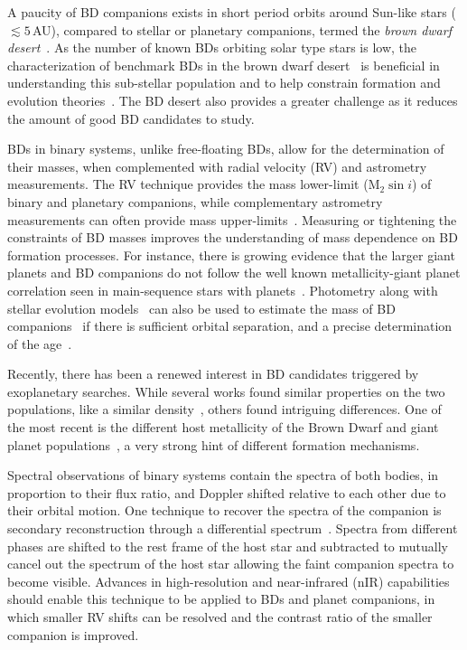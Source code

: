 \documentclass[fleqn,usenatbib]{mnras}
\begin{document}
A paucity of BD companions exists in short period orbits around Sun-like stars (\(\lesssim5\)\,AU), compared to stellar or planetary companions, termed the \emph{brown dwarf desert}~\citep{halbwachs_exploring_2000,zucker_analysis_2001,sahlmann_search_2011}. As the number of known BDs orbiting solar type stars is low, the characterization of benchmark BDs in the brown dwarf desert~\citep[e.g.][]{crepp_trends_2016} is beneficial in understanding this sub-stellar population and to help constrain formation and evolution theories~\citep{whitworth_formation_2007}. The BD desert also provides a greater challenge as it reduces the amount of good BD candidates to study.

BDs in binary systems, unlike free-floating BDs, allow for the determination of their masses, when complemented with radial velocity (RV) and astrometry measurements. The RV technique provides the mass lower-limit (\(\textrm{M}_{2}\sin{i}\)) of binary and planetary companions, while complementary astrometry measurements can often provide mass upper-limits~\citep[e.g.][]{sahlmann_search_2011}. Measuring or tightening the constraints of BD masses improves the understanding of mass dependence on BD formation processes. For instance, there is growing evidence that the larger giant planets and BD companions do not follow the well known metallicity-giant planet correlation seen in main-sequence stars with planets~\citep[e.g.][]{santos_spectroscopic_2004,santos_observational_2017, maldonado_searching_2017}. Photometry along with stellar evolution models~\citep[e.g.][]{baraffe_evolutionary_2003,allard_btsettl_2013} can also be used to estimate the mass of BD companions~\citep[e.g.][]{moutou_eccentricity_2017} if there is sufficient orbital separation, and a precise determination of the age~\citep[e.g.][]{soderblom_ages_2010}.

Recently, there has been a renewed interest in BD candidates triggered by exoplanetary searches. While several works found similar properties on the two populations, like a similar density~\citep{hatzes_definition_2015}, others found intriguing differences. One of the most recent is the different host metallicity of the Brown Dwarf and giant planet populations~\citep{santos_observational_2017, schlaufman_evidence_2018}, a very strong hint of different formation mechanisms.

Spectral observations of binary systems contain the spectra of both bodies, in proportion to their flux ratio, and Doppler shifted relative to each other due to their orbital motion. One technique to recover the spectra of the companion is secondary reconstruction through a differential spectrum~\citep{ferluga_separating_1997}. Spectra from different phases are shifted to the rest frame of the host star and subtracted to mutually cancel out the spectrum of the host star allowing the faint companion spectra to become visible. Advances in high-resolution and near-infrared (nIR) capabilities should enable this technique to be applied to BDs and planet companions, in which smaller RV shifts can be resolved and the contrast ratio of the smaller companion is improved.
\end{document}
